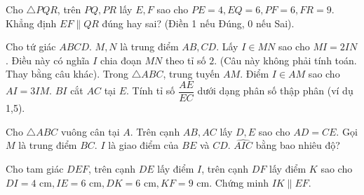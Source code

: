 \begin{bt}%
	Cho $\triangle PQR$, trên $PQ, PR$ lấy $E, F$ sao cho $PE=4, EQ=6, PF=6, FR=9$. Khẳng định $EF \parallel QR$ đúng hay sai? (Điền 1 nếu Đúng, 0 nếu Sai).
\end{bt}

\begin{bt}%
	Cho tứ giác $ABCD$. $M, N$ là trung điểm $AB, CD$. Lấy $I \in MN$ sao cho $MI = 2IN$. Điều này có nghĩa $I$ chia đoạn $MN$ theo tỉ số $2$. (Câu này không phải tính toán. Thay bằng câu khác).
	Trong $\triangle ABC$, trung tuyến $AM$. Điểm $I \in AM$ sao cho $AI = 3IM$. $BI$ cắt $AC$ tại $E$. Tính tỉ số $\dfrac{AE}{EC}$ dưới dạng phân số thập phân (ví dụ 1,5).
\end{bt}

\begin{bt}%
	Cho $\triangle ABC$ vuông cân tại $A$. Trên cạnh $AB, AC$ lấy $D, E$ sao cho $AD=CE$. Gọi $M$ là trung điểm $BC$. $I$ là giao điểm của $BE$ và $CD$. $\widehat{AIC}$ bằng bao nhiêu độ?
\end{bt}

\begin{bt}%
	Cho tam giác $DEF$, trên cạnh $DE$ lấy điểm $I$, trên cạnh $DF$ lấy điểm $K$ sao cho $DI = 4\text{ cm}, IE = 6\text{ cm}, DK = 6\text{ cm}, KF = 9\text{ cm}$. Chứng minh $IK \parallel EF$.
\end{bt}

